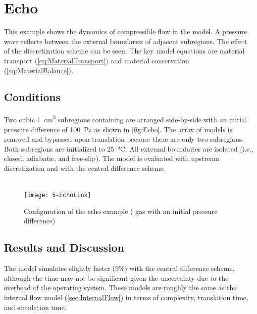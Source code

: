 \FloatBarrier %
\section{Echo}

This example shows the dynamics of compressible flow in the model.  A pressure wave reflects between the external boundaries of adjacent subregions.  The effect of the discretization scheme can be seen.  The key model equations are material transport (\autoref{eq:MaterialTransport}) and material conservation (\autoref{eq:MaterialBalance}).

\subsection{Conditions}

Two cubic \SI{1}{cm^3} subregions containing  are arranged side-by-side with an initial pressure difference of \SI{100}{Pa} as shown in \autoref{fig:Echo}.  The  array of models is removed and bypassed upon translation because there are only two subregions.  Both subregions are initialized to \SI{25}{\celsius}.  All external boundaries are isolated (i.e., closed, adiabatic, and free-slip).  The model is evaluated with upstream discretization and with the central difference scheme.

\begin{figure}[htbp]
  \vspace*{-1.6cm}\\\texttt{[image: 5-EchoLink]}\vspace*{-4cm}\\
  \caption{Configuration of the echo example ( gas with an initial pressure difference)}
  \label{fig:Echo}
\end{figure}

\subsection{Results and Discussion}



The model simulates slightly faster (9\%) with the central difference scheme, although the time may not be significant given the uncertainty due to the overhead of the operating system.  These models are roughly the same as the internal flow model (\autoref{sec:InternalFlow}) in terms of complexity, translation time, and simulation time.

